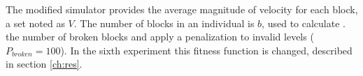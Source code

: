\documentclass[sigconf]{acmart}
\begin{document}
The modified 
simulator provides the average magnitude of
velocity for each block, %
a set noted as $V$. %
The number of blocks in an individual is $b$, used to calculate .
the number of broken blocks  
and apply a penalization to invalid levels ($P_{broken} = 100$). 
In the sixth experiment this fitness function is changed,
described in section \ref{ch:res}.
\end{document}
